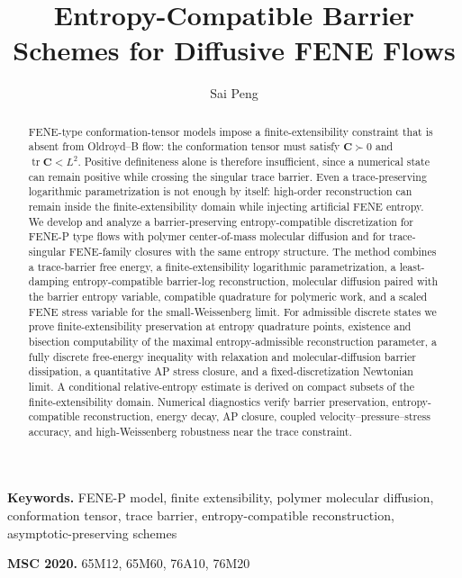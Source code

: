﻿\documentclass[11pt]{amsart}
\title[Barrier Schemes for FENE Flows]{Entropy-Compatible Barrier Schemes for Diffusive FENE Flows}
\author{Sai Peng}
\newcommand{\CC}{\bm C}
\newcommand{\tr}{\operatorname{tr}}
\begin{document}
\begin{abstract}
FENE-type conformation-tensor models impose a finite-extensibility constraint that is absent from Oldroyd--B flow: the conformation tensor must satisfy $\CC\succ0$ and $\tr\CC<L^2$.  Positive definiteness alone is therefore insufficient, since a numerical state can remain positive while crossing the singular trace barrier.  Even a trace-preserving logarithmic parametrization is not enough by itself: high-order reconstruction can remain inside the finite-extensibility domain while injecting artificial FENE entropy.  We develop and analyze a barrier-preserving entropy-compatible discretization for FENE-P type flows with polymer center-of-mass molecular diffusion and for trace-singular FENE-family closures with the same entropy structure.  The method combines a trace-barrier free energy, a finite-extensibility logarithmic parametrization, a least-damping entropy-compatible barrier-log reconstruction, molecular diffusion paired with the barrier entropy variable, compatible quadrature for polymeric work, and a scaled FENE stress variable for the small-Weissenberg limit.  For admissible discrete states we prove finite-extensibility preservation at entropy quadrature points, existence and bisection computability of the maximal entropy-admissible reconstruction parameter, a fully discrete free-energy inequality with relaxation and molecular-diffusion barrier dissipation, a quantitative AP stress closure, and a fixed-discretization Newtonian limit.  A conditional relative-entropy estimate is derived on compact subsets of the finite-extensibility domain.  Numerical diagnostics verify barrier preservation, entropy-compatible reconstruction, energy decay, AP closure, coupled velocity--pressure--stress accuracy, and high-Weissenberg robustness near the trace constraint.
\end{abstract}
\maketitle

\par\medskip\noindent\textbf{Keywords.} 
FENE-P model, finite extensibility, polymer molecular diffusion, conformation tensor, trace barrier, entropy-compatible reconstruction, asymptotic-preserving schemes
\par\medskip

\par\medskip\noindent\textbf{MSC 2020.} 
65M12, 65M60, 76A10, 76M20
\par\medskip
\end{document}
